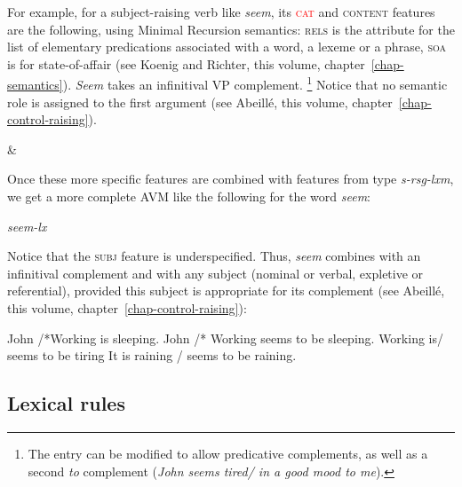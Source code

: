 \documentclass[output=paper
	        ,collection
	        ,collectionchapter
 	        ,biblatex
                ,babelshorthands
                ,newtxmath
                ,draftmode
                ,colorlinks, citecolor=brown
]{langscibook}
\begin{document}
For example, for a subject-raising verb like \emph{seem}, its \textcolor{red}{\textsc{cat}} and \textsc{content} features are the following, using Minimal Recursion semantics: \textsc{rels} is the attribute for the list of elementary predications associated with a word, a lexeme or a phrase, \textsc{soa} is for state-of-affair (see Koenig and Richter, this volume, chapter~\ref{chap-semantics}). \emph{Seem} takes an infinitival VP complement.%
%
\footnote{The entry can be modified to allow predicative complements, as well as a second \emph{to} complement (\emph{John seems tired/ in a good mood to me}).}
%
Notice that no semantic role is assigned to the first argument (see Abeillé, this volume, chapter~\ref{chap-control-raising}).

\ea\label{ex:prop23}
 \impl {} \&
\z

Once these more specific features are combined with features from type \emph{s-rsg-lxm}, we get a more complete AVM like the following for the word \emph{seem}:

\ea\label{ex:prop24}
\emph{seem-lx} \impl
{}
\z

Notice that the \textsc{subj} feature is underspecified. Thus, \emph{seem} combines with an infinitival complement and with any subject (nominal or verbal, expletive or referential), provided this subject is appropriate for its complement (see Abeillé, this volume, chapter~\ref{chap-control-raising}):

\ea\label{ex:prop25}
	\ea John /*Working is sleeping.
	\ex John /* Working seems to be sleeping.
	\ex Working is/ seems to be tiring
	\ex It is raining / seems to be raining.
	\z
\z

\subsection{Lexical rules}
\end{document}
